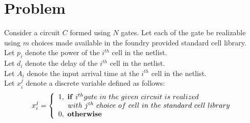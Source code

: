 \section{Problem}

\label{sec:problem}

\noindent Consider a circuit $C$ formed using  $N$ gates. Let each of the gate be realizable using $m$ choices made available in the foundry provided standard cell library.\\
Let $p_{i}$ denote the power of the $i^{th}$ cell in the netlist.\\
Let $d_{i}$ denote the delay of the $i^{th}$ cell in the netlist.\\
Let $A_{i}$ denote the input arrival time at the $i^{th}$ cell in the netlist.\\





 Let $x_{i}^{j}$ denote a discrete variable defined as follows:\\
  \begin{equation}
   {x_{i}^{j}} =
   \left\{
           \begin{array}{lllll}
                  1, \ {\bf if}\ i^{th} gate\  in\ the\ given\ circuit\ is\ realized\\
                  \  \  \ \ with\ j^{th}\ choice\ of\ cell\ in\ the\ standard\ cell\  library\\
                  0, \ {\bf otherwise}\\
          \end{array}
  \right.
  \end{equation}
 
 
 
